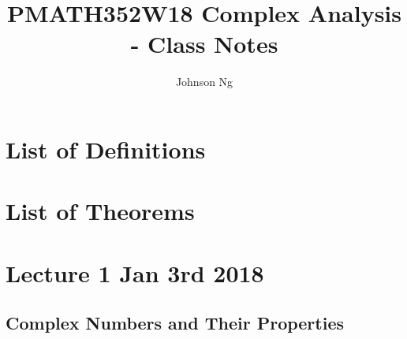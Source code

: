 \documentclass[notoc,notitlepage]{tufte-book}
\title{PMATH352W18 Complex Analysis - Class Notes}
\author{Johnson Ng}
\begin{document}
\hypersetup{pageanchor=false}
\maketitle
\hypersetup{pageanchor=true}
\tableofcontents

\chapter*{List of Definitions}

\chapter*{List of Theorems}

\chapter{Lecture 1 Jan 3rd 2018}
	\label{chapter:lecture_1_jan_3rd_2018}

\section{Complex Numbers and Their Properties} %
\label{sec:complex_numbers_and_their_properties}
\end{document}
